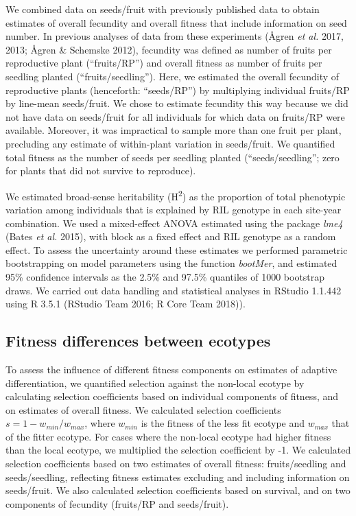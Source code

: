 \documentclass[
]{article}
\begin{document}
We combined data on seeds/fruit with previously published data to obtain estimates of overall fecundity and overall fitness that include information on seed number. In previous analyses of data from these experiments (Ågren \emph{et al.} 2017, 2013; Ågren \& Schemske 2012), fecundity was defined as number of fruits per reproductive plant (``fruits/RP'') and overall fitness as number of fruits per seedling planted (``fruits/seedling''). Here, we estimated the overall fecundity of reproductive plants (henceforth: ``seeds/RP'') by multiplying individual fruits/RP by line-mean seeds/fruit. We chose to estimate fecundity this way because we did not have data on seeds/fruit for all individuals for which data on fruits/RP were available. Moreover, it was impractical to sample more than one fruit per plant, precluding any estimate of within-plant variation in seeds/fruit. We quantified total fitness as the number of seeds per seedling planted (``seeds/seedling''; zero for plants that did not survive to reproduce).

We estimated broad-sense heritability (H\textsuperscript{2}) as the proportion of total phenotypic variation among individuals that is explained by RIL genotype in each site-year combination. We used a mixed-effect ANOVA estimated using the package \emph{lme4} (Bates \emph{et al.} 2015), with block as a fixed effect and RIL genotype as a random effect. To assess the uncertainty around these estimates we performed parametric bootstrapping on model parameters using the function \emph{bootMer}, and estimated 95\% confidence intervals as the 2.5\% and 97.5\% quantiles of 1000 bootstrap draws. We carried out data handling and statistical analyses in RStudio 1.1.442 using R 3.5.1 (RStudio Team 2016; R Core Team 2018)).

\hypertarget{fitness-differences-between-ecotypes}{%
\subsection{Fitness differences between ecotypes}\label{fitness-differences-between-ecotypes}}

To assess the influence of different fitness components on estimates of adaptive differentiation, we quantified selection against the non-local ecotype by calculating selection coefficients based on individual components of fitness, and on estimates of overall fitness. We calculated selection coefficients \(s=1-w_{min}/w_{max}\), where \(w_{min}\) is the fitness of the less fit ecotype and \(w_{max}\) that of the fitter ecotype. For cases where the non-local ecotype had higher fitness than the local ecotype, we multiplied the selection coefficient by -1. We calculated selection coefficients based on two estimates of overall fitness: fruits/seedling and seeds/seedling, reflecting fitness estimates excluding and including information on seeds/fruit. We also calculated selection coefficients based on survival, and on two components of fecundity (fruits/RP and seeds/fruit).
\end{document}
